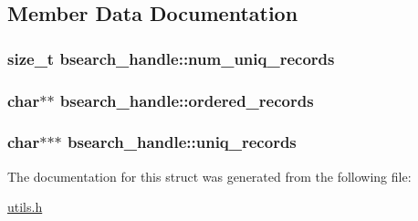 \subsection{\-Member \-Data \-Documentation}
\hypertarget{structbsearch__handle_ad71c165b2020a4040e89947e38646a05}{
\subsubsection[{num\-\_\-uniq\-\_\-records}]{\setlength{\rightskip}{0pt plus 5cm}size\-\_\-t {\bf bsearch\-\_\-handle\-::num\-\_\-uniq\-\_\-records}}}\label{structbsearch__handle_ad71c165b2020a4040e89947e38646a05}
\hypertarget{structbsearch__handle_afc72b1ba737f8fbd876df833d366aa0a}{
\subsubsection[{ordered\-\_\-records}]{\setlength{\rightskip}{0pt plus 5cm}char$\ast$$\ast$ {\bf bsearch\-\_\-handle\-::ordered\-\_\-records}}}\label{structbsearch__handle_afc72b1ba737f8fbd876df833d366aa0a}
\hypertarget{structbsearch__handle_a57b7985cee8d7b2ae2dfe70fdfd0da01}{
\subsubsection[{uniq\-\_\-records}]{\setlength{\rightskip}{0pt plus 5cm}char$\ast$$\ast$$\ast$ {\bf bsearch\-\_\-handle\-::uniq\-\_\-records}}}\label{structbsearch__handle_a57b7985cee8d7b2ae2dfe70fdfd0da01}


\-The documentation for this struct was generated from the following file\-:\begin{DoxyCompactItemize}
\item 
\hyperlink{utils_8h}{utils.\-h}\end{DoxyCompactItemize}

